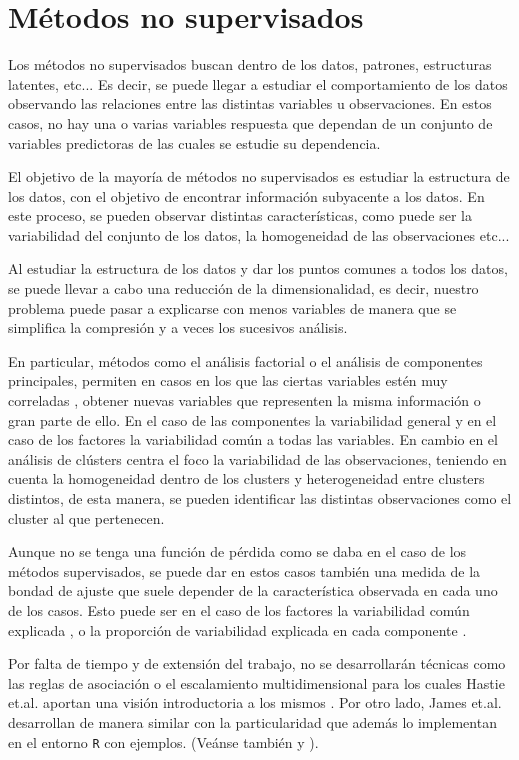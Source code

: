 \chapter{Métodos no supervisados}

\noindent Los métodos no  supervisados buscan dentro de los datos, patrones, estructuras latentes, etc... Es decir, se puede llegar a estudiar el comportamiento de los datos observando las relaciones entre las distintas variables u observaciones.  En estos casos, no hay una o varias  variables respuesta que dependan de un conjunto de variables predictoras de las cuales se estudie su dependencia.    

\noindent El objetivo de la mayoría de métodos no supervisados es estudiar la estructura de los datos, con el objetivo de encontrar información subyacente a los datos. En este proceso, se pueden observar distintas características, como puede ser la variabilidad del conjunto de los datos, la homogeneidad de las observaciones etc...

\noindent Al estudiar la estructura de los datos y dar los puntos comunes a todos los datos, se puede llevar a cabo una reducción de la dimensionalidad, es decir, nuestro problema puede pasar a explicarse con menos variables de manera que se simplifica la compresión \cite{Abdi 2010} y a veces los sucesivos análisis. 

\noindent En particular, métodos como el análisis factorial o el análisis de componentes principales, permiten en casos en los que las ciertas variables estén muy correladas \cite{Everitt 2011}, obtener  nuevas variables que representen la misma información o gran parte de ello. En el caso de las componentes la variabilidad general y en el caso de los factores la variabilidad común a todas las variables. En cambio en el análisis de clústers centra el foco la variabilidad de las observaciones, teniendo en cuenta la homogeneidad dentro de los clusters y heterogeneidad entre clusters distintos, de esta manera, se pueden identificar las distintas observaciones como el cluster al que pertenecen. 

\noindent Aunque no se tenga una función de pérdida como se daba en el caso de los métodos supervisados, se puede dar en estos casos también una medida de la bondad de ajuste que suele depender de la característica observada en cada uno de los casos. Esto puede ser en el caso de los factores la variabilidad común explicada \cite{Peña 2002}, o la proporción de variabilidad explicada en cada componente \cite{Chatfield 1989}. 

\noindent Por falta de tiempo y de extensión del trabajo, no se desarrollarán técnicas como las reglas de asociación o el escalamiento multidimensional para los cuales Hastie et.al. aportan una visión introductoria a los mismos \cite{Hastie 2001}. Por otro lado, James et.al. \cite{James 2013} desarrollan de manera similar con la particularidad  que además lo implementan en el entorno \texttt{R} con ejemplos. (Veánse también \cite{Everitt 2011} y \cite{Johnson 2007}).

  


\newpage 

\newpage
